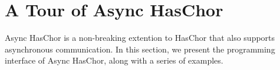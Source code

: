 \section{A Tour of Async HasChor}
\label{sec:tour}

Async HasChor is a non-breaking extention to HasChor that also supports asynchronous communication.
%
In this section, we present the programming interface of Async HasChor, along with a series of examples.
